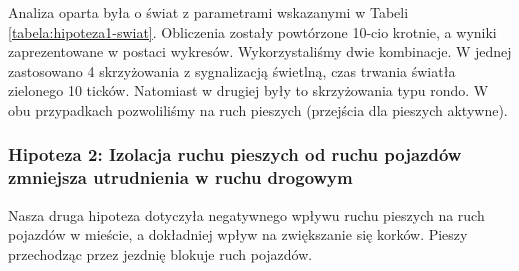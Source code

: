 \documentclass{article}
\begin{document}
Analiza oparta była o świat z parametrami wskazanymi w Tabeli \ref{tabela:hipoteza1-swiat}. Obliczenia zostały powtórzone 10-cio krotnie, a wyniki zaprezentowane w postaci wykresów. Wykorzystaliśmy dwie kombinacje. W jednej zastosowano 4 skrzyżowania z sygnalizacją świetlną, czas trwania światła zielonego 10 ticków. Natomiast w drugiej były to skrzyżowania typu rondo. W obu przypadkach pozwoliliśmy na ruch pieszych (przejścia dla pieszych aktywne).

\subsubsection{Hipoteza 2: Izolacja ruchu pieszych od ruchu pojazdów zmniejsza utrudnienia w ruchu drogowym}
Nasza druga hipoteza dotyczyła negatywnego wpływu ruchu pieszych na ruch pojazdów w mieście, a dokładniej wpływ na zwiększanie się korków. Pieszy przechodząc przez jezdnię blokuje ruch pojazdów. 
\end{document}

